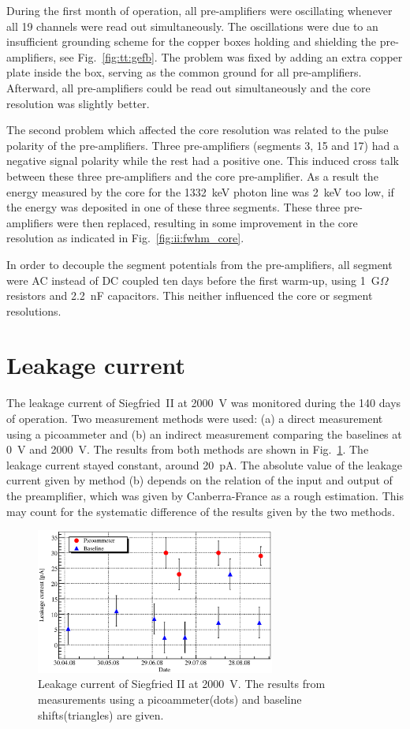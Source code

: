 During the first month of operation, all pre-amplifiers were
oscillating whenever all 19 channels were read out simultaneously. The
oscillations were due to an insufficient grounding scheme for the
copper boxes holding and shielding the pre-amplifiers, see
Fig.~\ref{fig:tt:gefb}. The problem was fixed by adding an extra
copper plate inside the box, serving as the common ground for all
pre-amplifiers. Afterward, all pre-amplifiers could be read out
simultaneously and the core resolution was slightly better.

The second problem which affected the core resolution was related to
the pulse polarity of the pre-amplifiers. Three pre-amplifiers
(segments 3, 15 and 17) had a negative signal polarity while the rest
had a positive one. This induced cross talk between these three
pre-amplifiers and the core pre-amplifier.  As a result the energy
measured by the core for the 1332~keV photon line was 2~keV too low,
if the energy was deposited in one of these three segments. These
three pre-amplifiers were then replaced, resulting in some improvement
in the core resolution as indicated in Fig.~\ref{fig:ii:fwhm_core}.

In order to decouple the segment potentials from the pre-amplifiers,
all segment were AC instead of DC coupled ten days before the first
warm-up, using 1~G$\Omega$ resistors and 2.2~nF capacitors. This
neither influenced the core or segment resolutions.


\section{Leakage current}
\label{sec:ii:current}
The leakage current of Siegfried~II at 2000~V was monitored during the
140 days of operation. Two measurement methods were used: (a) a direct
measurement using a picoammeter and (b) an indirect measurement
comparing the baselines at 0~V and 2000~V. The results from both
methods are shown in Fig.~\ref{fig:ii:lc}. The leakage current stayed
constant, around 20~pA. The absolute value of the leakage current
given by method (b) depends on the relation of the input and output of
the preamplifier, which was given by Canberra-France as a rough
estimation. This may count for the systematic difference of the
results given by the two methods.

\begin{figure}[htbp]
\centering
\includegraphics[width=0.7\textwidth, clip]{LC}
\caption{Leakage current of Siegfried II at 2000~V. The results from
measurements using a picoammeter(dots) and baseline shifts(triangles)
are given.}
\label{fig:ii:lc}
\end{figure}

